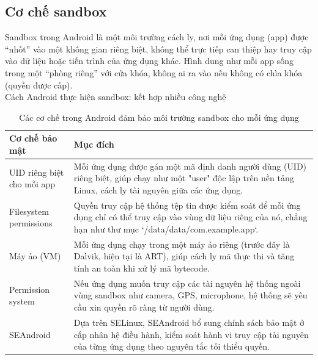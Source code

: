 \subsection{Cơ chế sandbox}
\renewcommand{\labelitemi}{--}    
    \begin{flushleft}
        \hspace*{0.8cm}Sandbox trong Android là một môi trường cách ly, nơi mỗi ứng dụng (app) được “nhốt” vào một không gian riêng biệt, không thể trực tiếp can thiệp hay truy cập vào dữ liệu hoặc tiến trình của ứng dụng khác. Hình dung như mỗi app sống trong một “phòng riêng” với cửa khóa, không ai ra vào nếu không có chìa khóa (quyền được cấp).\\
        \setlength{\leftmargini}{1.5cm}
        \hspace*{0.8cm}Cách Android thực hiện sandbox: kết hợp nhiều công nghệ
        \begin{table}[H]
            \centering
            \renewcommand{\arraystretch}{1.5}
            \begin{tabular}{|p{4.5cm}|p{11cm}|}
                \hline
                \textbf{Cơ chế bảo mật} & \textbf{Mục đích} \\
                \hline
                UID riêng biệt cho mỗi app & Mỗi ứng dụng được gán một mã định danh người dùng (UID) riêng biệt, giúp chạy như một "user" độc lập trên nền tảng Linux, cách ly tài nguyên giữa các ứng dụng. \\
                \hline
                Filesystem permissions & Quyền truy cập hệ thống tệp tin được kiểm soát để mỗi ứng dụng chỉ có thể truy cập vào vùng dữ liệu riêng của nó, chẳng hạn như thư mục `/data/data/com.example.app`. \\
                \hline
                Máy ảo (VM) & Mỗi ứng dụng chạy trong một máy ảo riêng (trước đây là Dalvik, hiện tại là ART), giúp cách ly mã thực thi và tăng tính an toàn khi xử lý mã bytecode. \\
                \hline
                Permission system & Nếu ứng dụng muốn truy cập các tài nguyên hệ thống ngoài vùng sandbox như camera, GPS, microphone, hệ thống sẽ yêu cầu xin quyền rõ ràng từ người dùng. \\
                \hline
                SEAndroid & Dựa trên SELinux, SEAndroid bổ sung chính sách bảo mật ở cấp nhân hệ điều hành, kiểm soát hành vi truy cập tài nguyên của từng ứng dụng theo nguyên tắc tối thiểu quyền. \\
                \hline
            \end{tabular}
            \caption{Các cơ chế trong Android đảm bảo môi trường sandbox cho mỗi ứng dụng}
            \label{table:android-sandbox-mechanisms}
            \end{table}
            
    \end{flushleft}

